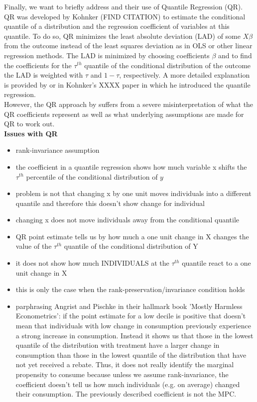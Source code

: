 Finally, we want to briefly address \cite{ms_14} and their use of Quantile Regression (QR). QR was developed by Kohnker (FIND CITATION) to estimate the conditional quantile of a distribution and the regression coefficient of variables at this quantile. To do so, QR minimizes the least absolute deviation (LAD) of some $X\beta$ from the outcome instead of the least squares deviation as in OLS or other linear regression methods. The LAD is minimized by choosing coefficients $\beta$ and to find the coefficients for the $\tau^{th}$ quantile of the conditional distribution of the outcome the LAD is weighted with $\tau$ and $1-\tau$, respectively. A more detailed explanation is provided by \cite{ms_14} or in Kohnker's XXXX paper in which he introduced the quantile regression. \\
However, the QR approach by \cite{ms_14} suffers from a severe misinterpretation of what the QR coefficients represent as well as what underlying assumptions are made for QR to work out. \\
\textbf{Issues with QR}
\begin{itemize}
    \item rank-invariance assumption
    \item the coefficient in a quantile regression shows how much variable x shifts the $\tau^{th}$ percentile of the conditional distribution of $y$
    \item problem is not that changing x by one unit moves individuals into a different quantile and therefore this doesn't show change for individual 
    \item changing x does not move individuals away from the conditional quantile 
    \item QR point estimate tells us by how much a one unit change in X changes the value of the $\tau^{th}$ quantile of the conditional distribution of Y 
    \item it does not show how much INDIVIDUALS at the $\tau^{th}$ quantile react to a one unit change in X
    \item this is only the case when the rank-preservation/invariance condition holds 
    \item parphrasing Angrist and Pischke in their hallmark book 'Mostly Harmless Econometrics': if the point estimate for a low decile is positive that doesn't mean that individuals with low change in consumption previously experience a strong increase in consumption. Instead it shows us that those in the lowest quantile of the distribution with treatment have a larger change in consumption than those in the lowest quantile of the distribution that have not yet received a rebate. Thus, it does not really identify the marginal propensity to consume because unless we assume rank-invariance, the coefficient doesn't tell us how much individuals (e.g. on average) changed their consumption. The previously described coefficient is not the MPC.
\end{itemize}

